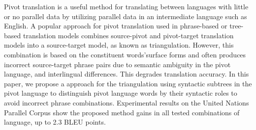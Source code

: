Pivot translation is a useful method for translating between languages with little or no parallel data by utilizing parallel data in an intermediate language such as English. A popular approach for pivot translation used in phrase-based or tree-based translation models combines source-pivot and pivot-target translation models into a source-target model, as known as triangulation. However, this combination is based on the constituent words'surface forms and often produces incorrect source-target phrase pairs due to semantic ambiguity in the pivot language, and interlingual differences. This degrades translation accuracy. In this paper, we propose a approach for the triangulation using syntactic subtrees in the pivot language to distinguish pivot language words by their syntactic roles to avoid incorrect phrase combinations. Experimental results on the United Nations Parallel Corpus show the proposed method gains in all tested combinations of language, up to 2.3 BLEU points.

